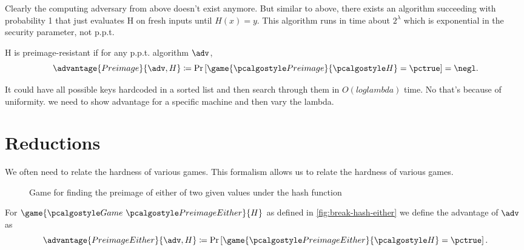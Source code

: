 Clearly the computing adversary from above doesn't exist anymore.
But similar to above, there exists an algorithm succeeding with probability 1 that just evaluates H on fresh inputs until $H(x) = y$.
This algorithm runs in time about $2^\lambda$ which is exponential in the security parameter, not p.p.t.

\begin{definition}
  H is preimage-resistant if for any p.p.t. algorithm $\adv$,
 \[
  \advantage{Preimage}{\adv, H} \defeq \pr{\game{\algo{Preimage}}{\algo{H}} = \pctrue} = \negl.
 \]
\end{definition}

It could have all possible keys hardcoded in a sorted list and then search through them in $O(log lambda)$ time.
No that's because of uniformity. we need to show advantage for a specific machine and then vary the lambda.


\section{Reductions}
We often need to relate the hardness of various games.
This formalism allows us to relate the hardness of various games.

\begin{figure}[tbhp]
  \begin{center}
    \begin{tcolorbox}[width=5cm]
      \begin{pchstack}[center]
      \end{pchstack}
    \end{tcolorbox}
  \end{center}
  \caption{Game for finding the preimage of either of two given values under the hash function \label{fig:break-hash-either}}
\end{figure}


\begin{definition}
  For $\game{\Game~\algo{PreimageEither}}{H}$ as defined in \autoref{fig:break-hash-either} we define the advantage of $\adv$ as
 \[
  \advantage{PreimageEither}{\adv, H} \defeq \pr{\game{\algo{PreimageEither}}{\algo{H}} = \pctrue}.
 \]
\end{definition}

